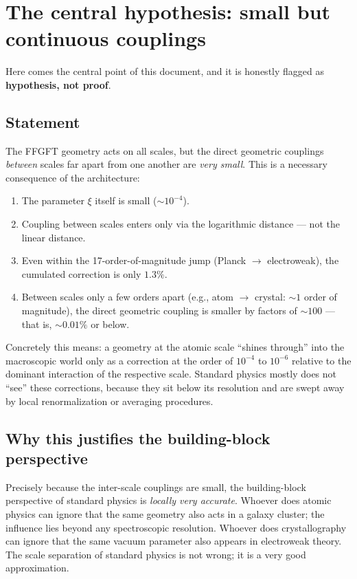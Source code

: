 \section{The central hypothesis: small but continuous couplings}

Here comes the central point of this document, and it is honestly
flagged as \textbf{hypothesis, not proof}.

\subsection*{Statement}

The FFGFT geometry acts on all scales, but the direct geometric
couplings \emph{between} scales far apart from one another are
\emph{very small}. This is a necessary consequence of the
architecture:

\begin{enumerate}\setlength\itemsep{2pt}
  \item The parameter $\xi$ itself is small ($\sim 10^{-4}$).
  \item Coupling between scales enters only via the logarithmic
        distance --- not the linear distance.
  \item Even within the 17-order-of-magnitude jump (Planck $\to$
        electroweak), the cumulated correction is only $1{.}3\%$.
  \item Between scales only a few orders apart (e.g., atom $\to$
        crystal: $\sim 1$ order of magnitude), the direct geometric
        coupling is smaller by factors of $\sim 100$ --- that is,
        $\sim 0{.}01\%$ or below.
\end{enumerate}

Concretely this means: a geometry at the atomic scale ``shines
through'' into the macroscopic world only as a correction at the
order of $10^{-4}$ to $10^{-6}$ relative to the dominant interaction
of the respective scale. Standard physics mostly does not ``see''
these corrections, because they sit below its resolution and are
swept away by local renormalization or averaging procedures.

\subsection*{Why this justifies the building-block perspective}

Precisely because the inter-scale couplings are small, the
building-block perspective of standard physics is \emph{locally very
accurate}. Whoever does atomic physics can ignore that the same
geometry also acts in a galaxy cluster; the influence lies beyond any
spectroscopic resolution. Whoever does crystallography can ignore that
the same vacuum parameter also appears in electroweak theory. The
scale separation of standard physics is not wrong; it is a very good
approximation.

